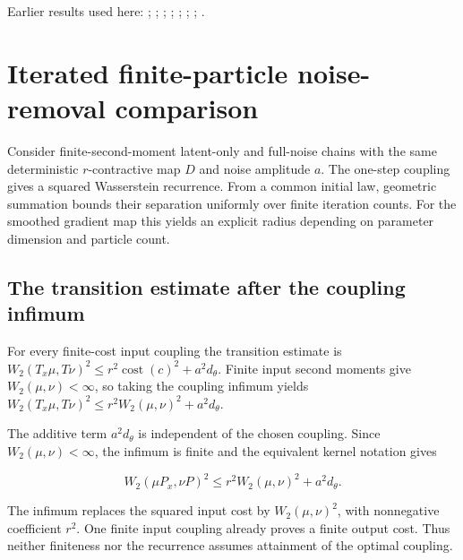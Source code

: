 \documentclass[11pt,a4paper]{report}
\begin{document}
Earlier results used here: \cite[Section~3.17.1]{LangevinLean2026ULASC}; \cite[Section~3.17.2]{LangevinLean2026ULASC}; \cite[Section~3.17.3]{LangevinLean2026ULASC}; \cite[Section~3.17.4]{LangevinLean2026ULASC}; \cite[Section~3.22.10]{LangevinLean2026ULASC}; \cite[Section~3.33.5]{LangevinLean2026ULASC}; \cite[Section~3.1.1]{LangevinLean2026IPLA}; \cite[Section~3.11.1]{LangevinLean2026IPLA}.
\section{\texorpdfstring{Iterated finite-particle noise-removal comparison}{Iterated finite-particle noise-removal comparison}}
\label{proof-module-ProximalLangevin-MYPGD-lean}


Consider finite-second-moment latent-only and full-noise chains with the same deterministic \(r\)-contractive map \(D\) and noise amplitude \(a\). The one-step coupling gives a squared Wasserstein recurrence. From a common initial law, geometric summation bounds their separation uniformly over finite iteration counts. For the smoothed gradient map this yields an explicit radius depending on parameter dimension and particle count.

\subsection{\texorpdfstring{The transition estimate after the coupling infimum}{The transition estimate after the coupling infimum}}
\label{report-step-ProximalLangevin-MYPGD-lean-1}


For every finite-cost input coupling the transition estimate is \(W_2(T_x\mu,T\nu)^2\le r^2\operatorname{cost}(c)^2+a^2d_\theta\). Finite input second moments give \(W_2(\mu,\nu)<\infty\), so taking the coupling infimum yields \(W_2(T_x\mu,T\nu)^2\le r^2W_2(\mu,\nu)^2+a^2d_\theta\).



The additive term \(a^2d_\theta\) is independent of the chosen coupling. Since \(W_2(\mu,\nu)<\infty\), the infimum is finite and the equivalent kernel notation gives

\[W_2(\mu P_x,\nu P)^2\le r^2W_2(\mu,\nu)^2+a^2d_\theta.\]

The infimum replaces the squared input cost by \(W_2(\mu,\nu)^2\), with nonnegative coefficient \(r^2\). One finite input coupling already proves a finite output cost. Thus neither finiteness nor the recurrence assumes attainment of the optimal coupling.
\end{document}
